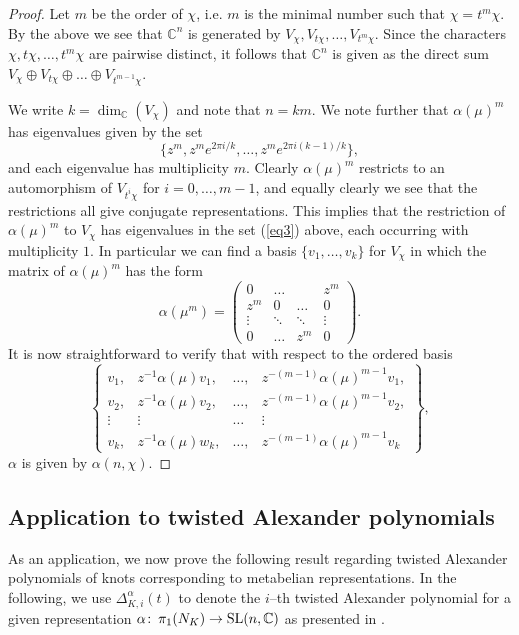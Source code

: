 \documentclass[12pt]{amsart}
\theoremstyle{plain}
\theoremstyle{remark}
\begin{document}
\begin{proof}
Let $m$ be the order of $\chi$, i.e. $m$ is the minimal number such that $\chi=t^m\chi$.
By the above we see that ${{\mathbb C}}^n$ is generated by $V_{\chi}, V_{t \chi}, \dots,V_{t^m\chi}$.
Since the characters $\chi, t\chi, \dots,t^m\chi$ are pairwise distinct, it follows  that  ${{\mathbb C}}^n$ is given as the direct sum $V_{\chi}\oplus V_{t\chi}\oplus \dots \oplus V_{t^{m-1}\chi}$.

We write $k=\dim_{{\mathbb C}}(V_{\chi})$ and note that $n=km$. We note further that ${\alpha}(\mu)^m$ has   eigenvalues given by the set
\begin{equation}\label{eq3}
\{z^m,z^me^{2\pi i/k},\dots,z^me^{2\pi i(k-1)/k}\},
\end{equation}
and each eigenvalue has multiplicity $m$.
Clearly ${\alpha}(\mu)^m$ restricts to an automorphism of $V_{t^i\chi}$ for $i=0,\dots,m -1$, and
equally clearly we see that the restrictions all give conjugate representations.
This implies that the restriction of ${\alpha}(\mu)^m$ to $V_{\chi}$ has  eigenvalues in the
set (\ref{eq3}) above, each occurring with multiplicity $1$.
In particular we can find a basis
 $\{v_1,\dots,v_k\}$  for $V_\chi$ in which the matrix of ${\alpha}(\mu)^m$ has the form
 $${\alpha}(\mu^m) =\begin{pmatrix}
0& \dots& &z^m \\
z^m& 0&\dots&0 \\
\vdots &\ddots &\ddots&\vdots \\
     0&\dots &z^m &0 \end{pmatrix}.$$
It is now straightforward to verify that with respect to the ordered basis
$$\left\{ \begin{array}{cccc}
v_1,&z^{-1}{\alpha}(\mu)v_1,&\dots,&z^{-(m-1)}{\alpha}(\mu)^{m-1}v_1,\\
v_2,&z^{-1}{\alpha}(\mu)v_2,&\dots,&z^{-(m-1)}{\alpha}(\mu)^{m-1}v_2,\\
\vdots &\vdots &\dots& \vdots \\
v_k,&z^{-1}{\alpha}(\mu)w_k,&\dots,&z^{-(m-1)}{\alpha}(\mu)^{m-1}v_k\end{array}\right\} ,$$
${\alpha}$ is given by ${\alpha}(n,\chi)$.
\end{proof}

\subsection{Application to twisted Alexander polynomials}\label{section:twialex}
As an application, we now prove the following result regarding twisted Alexander polynomials of knots
corresponding to metabelian representations.
In the following, we use  $\Delta^{\alpha}_{K,i}(t)$ to denote the $i$--th twisted Alexander
polynomial for a given representation ${\alpha} {\colon\thinspace} \pi_1(N_K) \to {{\rm SL}}(n,{{\mathbb C}})$ as presented
in \cite{FV09}.
\end{document}
